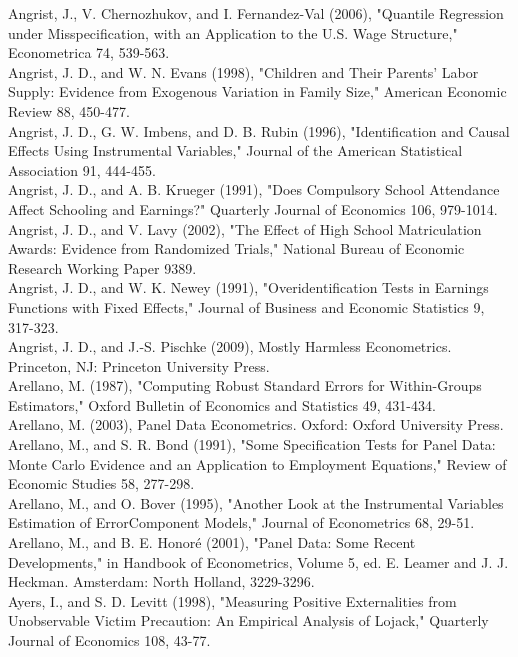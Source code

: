 \documentclass[10pt]{article}
\begin{document}
Angrist, J., V. Chernozhukov, and I. Fernandez-Val (2006), "Quantile Regression under Misspecification, with an Application to the U.S. Wage Structure," Econometrica 74, 539-563.\\
Angrist, J. D., and W. N. Evans (1998), "Children and Their Parents' Labor Supply: Evidence from Exogenous Variation in Family Size," American Economic Review 88, 450-477.\\
Angrist, J. D., G. W. Imbens, and D. B. Rubin (1996), "Identification and Causal Effects Using Instrumental Variables," Journal of the American Statistical Association 91, 444-455.\\
Angrist, J. D., and A. B. Krueger (1991), "Does Compulsory School Attendance Affect Schooling and Earnings?" Quarterly Journal of Economics 106, 979-1014.\\
Angrist, J. D., and V. Lavy (2002), "The Effect of High School Matriculation Awards: Evidence from Randomized Trials," National Bureau of Economic Research Working Paper 9389.\\
Angrist, J. D., and W. K. Newey (1991), "Overidentification Tests in Earnings Functions with Fixed Effects," Journal of Business and Economic Statistics 9, 317-323.\\
Angrist, J. D., and J.-S. Pischke (2009), Mostly Harmless Econometrics. Princeton, NJ: Princeton University Press.\\
Arellano, M. (1987), "Computing Robust Standard Errors for Within-Groups Estimators," Oxford Bulletin of Economics and Statistics 49, 431-434.\\
Arellano, M. (2003), Panel Data Econometrics. Oxford: Oxford University Press.\\
Arellano, M., and S. R. Bond (1991), "Some Specification Tests for Panel Data: Monte Carlo Evidence and an Application to Employment Equations," Review of Economic Studies 58, 277-298.\\
Arellano, M., and O. Bover (1995), "Another Look at the Instrumental Variables Estimation of ErrorComponent Models," Journal of Econometrics 68, 29-51.\\
Arellano, M., and B. E. Honoré (2001), "Panel Data: Some Recent Developments," in Handbook of Econometrics, Volume 5, ed. E. Leamer and J. J. Heckman. Amsterdam: North Holland, 3229-3296.\\
Ayers, I., and S. D. Levitt (1998), "Measuring Positive Externalities from Unobservable Victim Precaution: An Empirical Analysis of Lojack," Quarterly Journal of Economics 108, 43-77.\\
\end{document}
